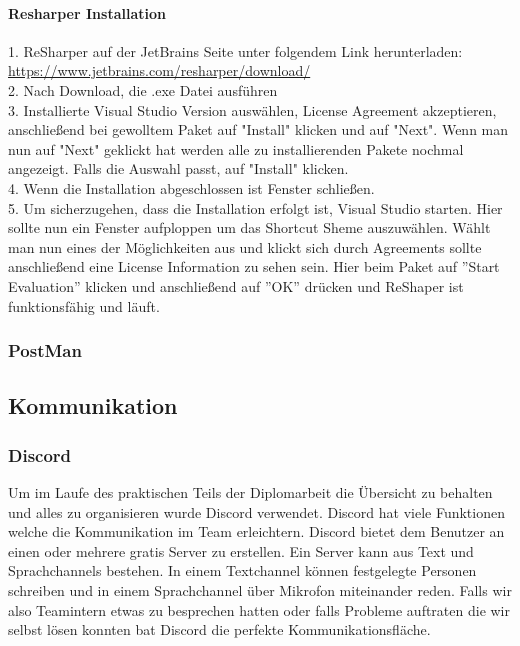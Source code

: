 \paragraph {Resharper Installation}
1. ReSharper auf der JetBrains Seite unter folgendem Link herunterladen: \break \url {https://www.jetbrains.com/resharper/download/} \\
2. Nach Download, die .exe Datei ausführen \\
3. Installierte Visual Studio Version auswählen, License Agreement akzeptieren, anschließend bei gewolltem Paket auf "Install" klicken und auf "Next". 
Wenn man nun auf "Next" geklickt hat werden alle zu installierenden Pakete nochmal angezeigt. Falls die Auswahl passt, auf "Install" klicken. \\
4. Wenn die Installation abgeschlossen ist Fenster schließen. \\
5. Um sicherzugehen, dass die Installation erfolgt ist, Visual Studio starten. Hier sollte nun ein Fenster aufploppen um das Shortcut Sheme auszuwählen.
Wählt man nun eines der Möglichkeiten aus und klickt sich durch Agreements sollte anschließend eine License Information zu sehen sein. Hier beim Paket auf ''Start Evaluation'' klicken und anschließend auf ''OK'' drücken und ReShaper ist funktionsfähig und läuft.

\subsubsection {PostMan}


\subsection{Kommunikation}
\subsubsection {Discord}
Um im Laufe des praktischen Teils der Diplomarbeit die Übersicht zu behalten und alles zu organisieren wurde Discord verwendet. Discord hat viele Funktionen welche die Kommunikation im Team erleichtern. Discord bietet dem Benutzer an einen oder mehrere gratis Server zu erstellen. Ein Server kann aus Text und Sprachchannels bestehen. In einem Textchannel können festgelegte Personen schreiben und in einem Sprachchannel über Mikrofon miteinander reden. Falls wir also Teamintern etwas zu besprechen hatten oder falls Probleme auftraten die wir selbst lösen konnten bat Discord die perfekte Kommunikationsfläche. 

